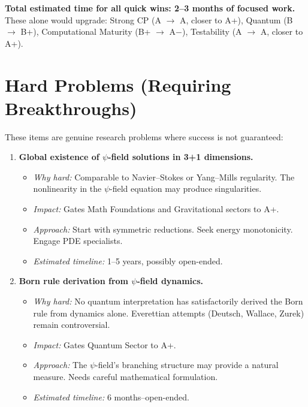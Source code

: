 \documentclass[11pt,a4paper]{article}
\begin{document}
\noindent\textbf{Total estimated time for all quick wins: 2--3 months of focused work.}
These alone would upgrade: Strong CP (A $\to$ A, closer to A+), Quantum (B $\to$ B+), Computational Maturity (B+ $\to$ A$-$), Testability (A $\to$ A, closer to A+).


\section{Hard Problems (Requiring Breakthroughs)}

These items are genuine research problems where success is not guaranteed:

\begin{enumerate}
    \item \textcolor{hardproblem}{\textbf{Global existence of $\psi$-field solutions in 3+1 dimensions.}}
    \begin{itemize}
        \item \emph{Why hard:} Comparable to Navier--Stokes or Yang--Mills regularity. The nonlinearity in the $\psi$-field equation may produce singularities.
        \item \emph{Impact:} Gates Math Foundations and Gravitational sectors to A+.
        \item \emph{Approach:} Start with symmetric reductions. Seek energy monotonicity. Engage PDE specialists.
        \item \emph{Estimated timeline:} 1--5 years, possibly open-ended.
    \end{itemize}

    \item \textcolor{hardproblem}{\textbf{Born rule derivation from $\psi$-field dynamics.}}
    \begin{itemize}
        \item \emph{Why hard:} No quantum interpretation has satisfactorily derived the Born rule from dynamics alone. Everettian attempts (Deutsch, Wallace, Zurek) remain controversial.
        \item \emph{Impact:} Gates Quantum Sector to A+.
        \item \emph{Approach:} The $\psi$-field's branching structure may provide a natural measure. Needs careful mathematical formulation.
        \item \emph{Estimated timeline:} 6 months--open-ended.
    \end{itemize}


\end{enumerate}
\end{document}
